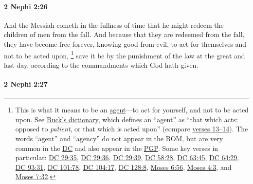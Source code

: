 		\paragraph{2 Nephi 2:26} %
			\label{2NEPHI-2-26}

			And the Messiah cometh in the fullness of time
			that he might redeem the children of men from the fall.
			And because that they are redeemed from the fall,
			they have become free forever,
			knowing good from evil,
			to act for themselves and not to be acted upon,%
				\footnote{%
					This is what it means to be an \hyperref[AGENCY]{agent}---to act for yourself, and not to be acted upon. See \hyperref[AGENCY-BTD]{Buck's dictionary}, which defines an ``agent'' as ``that which acts: opposed to \textit{patient}, or that which is acted upon'' (compare \hyperref[2NEPHI-2-13]{verses 13--14}). The words ``agent'' and ``agency'' do not appear in the BOM, but are very common in the \hyperref[AGENCY-DC]{DC} and also appear in the \hyperref[AGENCY-PGP]{PGP}. Some key verses in particular: \hyperref[DC29-35]{DC 29:35}, \hyperref[DC29-36]{DC 29:36}, \hyperref[DC29-39]{DC 29:39}, \hyperref[DC58-28]{DC 58:28}, \hyperref[DC63-45]{DC 63:45}, \hyperref[DC64-29]{DC 64:29}, \hyperref[DC93-31]{DC 93:31}, \hyperref[DC101-78]{DC 101:78}, \hyperref[DC104-17]{DC 104:17}, \hyperref[DC128-8]{DC 128:8}, \hyperref[MOSES-6-56]{Moses 6:56}, \hyperref[MOSES-4-3]{Moses 4:3}, and \hyperref[MOSES-7-32]{Moses 7:32}.
					}
			save it be by the punishment of the law at the great and last day,
			according to the commandments which God hath given.

		\paragraph{2 Nephi 2:27} %
			\label{2NEPHI-2-27}

